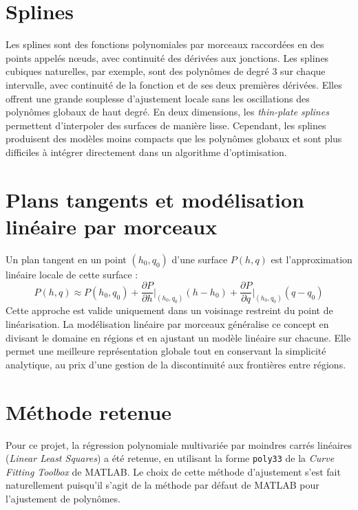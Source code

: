 \documentclass[12pt, letterpaper]{report}
\begin{document}
\section{Splines}

Les splines sont des fonctions polynomiales par morceaux raccordées en des points appelés nœuds, avec continuité des dérivées aux jonctions. Les splines cubiques naturelles, par exemple, sont des polynômes de degré 3 sur chaque intervalle, avec continuité de la fonction et de ses deux premières dérivées. Elles offrent une grande souplesse d'ajustement locale sans les oscillations des polynômes globaux de haut degré. En deux dimensions, les \textit{thin-plate splines} permettent d'interpoler des surfaces de manière lisse. Cependant, les splines produisent des modèles moins compacts que les polynômes globaux et sont plus difficiles à intégrer directement dans un algorithme d'optimisation.

\section{Plans tangents et modélisation linéaire par morceaux}

Un plan tangent en un point $(h_0, q_0)$ d'une surface $P(h,q)$ est l'approximation linéaire locale de cette surface :
\begin{equation}
  P(h,q) \approx P(h_0,q_0) + \frac{\partial P}{\partial h}\bigg|_{(h_0,q_0)}(h-h_0) + \frac{\partial P}{\partial q}\bigg|_{(h_0,q_0)}(q-q_0)
\end{equation}
Cette approche est valide uniquement dans un voisinage restreint du point de linéarisation. La modélisation linéaire par morceaux généralise ce concept en divisant le domaine en régions et en ajustant un modèle linéaire sur chacune. Elle permet une meilleure représentation globale tout en conservant la simplicité analytique, au prix d'une gestion de la discontinuité aux frontières entre régions.

\section{Méthode retenue}

Pour ce projet, la régression polynomiale multivariée par moindres carrés linéaires (\textit{Linear Least Squares}) a été retenue, en utilisant la forme \texttt{poly33} de la \textit{Curve Fitting Toolbox} de MATLAB. Le choix de cette méthode d'ajustement s'est fait naturellement puisqu'il s'agit de la méthode par défaut de MATLAB pour l'ajustement de polynômes.
\end{document}
